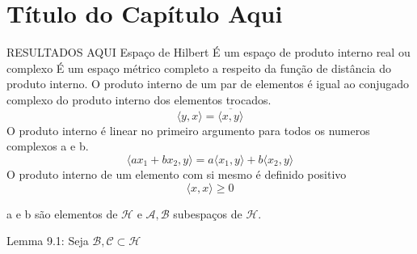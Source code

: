 \chapter{Título do Capítulo Aqui} \label{cap5}
RESULTADOS AQUI
\newline
Espaço de Hilbert
É um espaço de produto interno real ou complexo \newline
É um espaço métrico completo a respeito da função de distância do produto interno.
\newline
O produto interno de um par de elementos é igual ao conjugado complexo do produto interno dos elementos trocados.
\begin{equation}
\langle y,x \rangle=\overline{\langle x,y \rangle}
\end{equation}
O produto interno é linear no primeiro argumento para todos os numeros complexos a e b.
\begin{equation}
\langle ax_1+bx_2,y \rangle=a\langle x_1,y \rangle + b \langle x_2,y\rangle
\end{equation}
O produto interno de um elemento com si mesmo é definido positivo
\begin{equation}
\langle x,x \rangle \geqslant 0
\end{equation}

a e b são elementos de $\mathcal{H}$ e $\mathcal{A, B}$ subespaços de $\mathcal{H}$.


Lemma 9.1: Seja $\mathcal{ B, C} \subset \mathcal{H}$

























